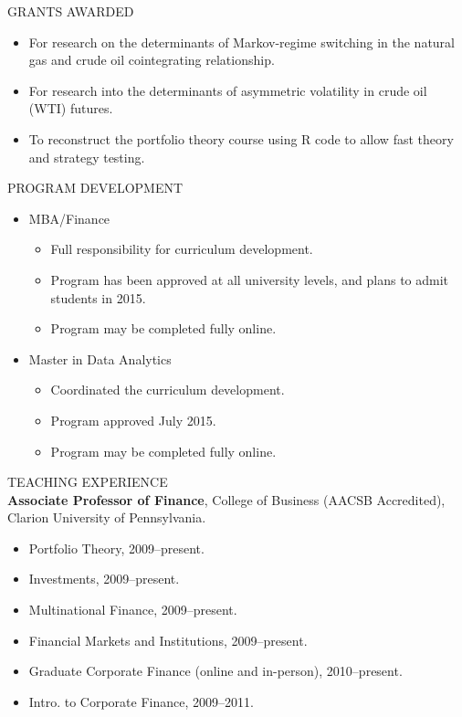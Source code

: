 \documentclass[9pt]{article}
\begin{document}
\vspace{10pt}
GRANTS AWARDED
\begin{itemize}[noitemsep, nolistsep]
\item For research on the determinants of Markov-regime switching in the natural gas and crude oil cointegrating relationship. 
\item For research into the determinants of asymmetric volatility in crude oil (WTI) futures. 
\item To reconstruct the portfolio theory course using R code to allow fast theory and strategy testing.
\end{itemize}
\vspace{10pt}
PROGRAM DEVELOPMENT
\begin{itemize}[noitemsep, nolistsep]
\item MBA/Finance 
  \begin{itemize}[noitemsep, nolistsep]
    \item Full responsibility for curriculum development.
    \item Program has been approved at all university levels, and plans to admit students in 2015.
    \item Program may be completed fully online.
  \end{itemize}
\item Master in Data Analytics
  \begin{itemize}[noitemsep, nolistsep]
    \item Coordinated the curriculum development.
    \item Program approved July 2015.
    \item Program may be completed fully online.
  \end{itemize}
\end{itemize}
\vspace{10pt}
TEACHING EXPERIENCE\\
{\bf Associate Professor of Finance}, College of Business (AACSB Accredited), Clarion University of Pennsylvania.
\begin{itemize}[noitemsep, nolistsep]
\item Portfolio Theory, 2009--present.
\item Investments, 2009--present.
\item Multinational Finance, 2009--present.
\item Financial Markets and Institutions, 2009--present.
\item Graduate Corporate Finance (online and in-person), 2010--present.
\item Intro. to Corporate Finance, 2009--2011.
\end{itemize}
\end{document}
